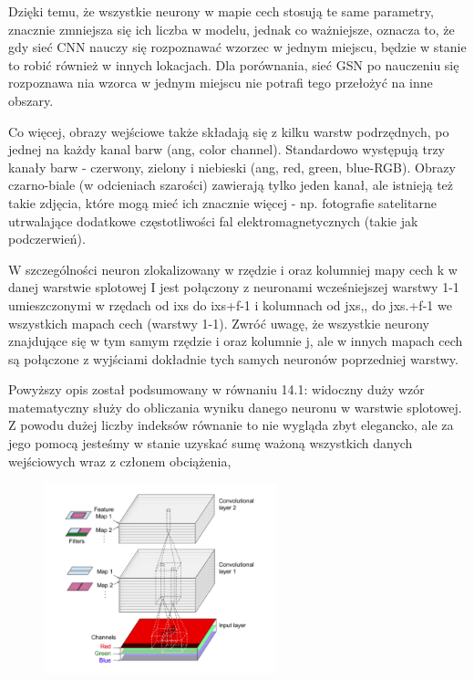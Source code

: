 \documentclass{article}
\begin{document}
Dzięki temu, że wszystkie neurony w mapie cech stosują te same parametry, znacznie zmniejsza się ich liczba w modelu, jednak co ważniejsze, oznacza to, że gdy sieć CNN nauczy się rozpoznawać wzorzec w jednym miejscu, będzie w stanie to robić również w innych lokacjach. Dla porównania, sieć GSN po nauczeniu się rozpoznawa nia wzorca w jednym miejscu nie potrafi tego przełożyć na inne obszary. \cite{geron}

Co więcej, obrazy wejściowe także składają się z kilku warstw podrzędnych, po jednej na każdy kanal barw (ang, color channel). Standardowo występują trzy kanały barw - czerwony, zielony i niebieski (ang, red, green, blue-RGB). Obrazy czarno-biale (w odcieniach szarości) zawierają tylko jeden kanał, ale istnieją też takie zdjęcia, które mogą mieć ich znacznie więcej - np. fotografie satelitarne utrwalające dodatkowe częstotliwości fal elektromagnetycznych (takie jak podczerwień). \cite{geron}

W szczególności neuron zlokalizowany w rzędzie i oraz kolumniej mapy cech k w danej warstwie splotowej I jest połączony z neuronami wcześniejszej warstwy 1-1 umieszczonymi w rzędach od ixs do ixs+f-1 i kolumnach od jxs,, do jxs.+f-1 we wszystkich mapach cech (warstwy 1-1). Zwróć uwagę, że wszystkie neurony znajdujące się w tym samym rzędzie i oraz kolumnie j, ale w innych mapach cech są połączone z wyjściami dokładnie tych samych neuronów poprzedniej warstwy. \cite{geron}

Powyższy opis został podsumowany w równaniu 14.1: widoczny duży wzór matematyczny służy do obliczania wyniku danego neuronu w warstwie splotowej. Z powodu dużej liczby indeksów równanie to nie wygląda zbyt elegancko, ale za jego pomocą jesteśmy w stanie uzyskać sumę ważoną wszystkich danych wejściowych wraz z członem obciążenia, \cite{geron}
\begin{figure}[H]
	\centering
	\includegraphics[width=0.6\textwidth,keepaspectratio=true]{stosy_map_cech}
	\caption{}
\end{figure}
\end{document}
